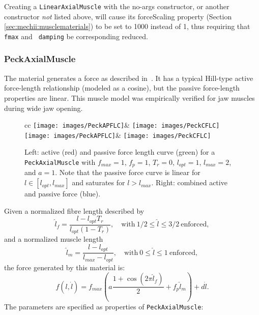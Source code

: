 \begin{sideblock}
Creating a {\tt LinearAxialMuscle} with the no-args constructor, or
another constructor {\it not} listed above, will cause its {\sf
forceScaling} property (Section \ref{sec:mechii:musclematerials}) to
be set to 1000 instead of 1, thus requiring that {\tt fmax} and {\tt
damping} be corresponding reduced.
\end{sideblock}

\subsubsection{PeckAxialMuscle}

The 
material generates a force as described in~\cite{peck2000dynamic}. 
It has a typical Hill-type active force-length relationship (modeled
as a cosine), but the passive force-length properties are linear. This
muscle model was empirically verified for jaw muscles during wide jaw
opening.

\begin{figure}[ht]
\begin{center}
\begin{tabular}{cc}
   \iflatexml
      \texttt{[image: images/PeckAPFLC]}&
      \texttt{[image: images/PeckCFLC]}
   \else
      \texttt{[image: images/PeckAPFLC]}&
      \texttt{[image: images/PeckCFLC]}
   \fi
\end{tabular}
\end{center}
\caption{Left: active (red) and passive force length curve (green)
for a {\tt PeckAxialMuscle} with $f_{max} = 1$, $f_{p} = 1$, $T_r =
0$, $l_{opt} = 1$, $l_{max} = 2$, and $a = 1$. Note that the passive
force curve is linear for $l \in [l_{opt}, l_{max}]$ and saturates for
$l > l_{max}$. Right: combined active and passive force (blue).}
\label{PeckCurves:fig}
\end{figure}

Given a normalized fibre length described by
%
\begin{equation}
\hat l_f = \frac{l - l_{opt} T_r}{l_{opt} (1 - T_r)}, 
\quad \mathrm{with}~ 1/2 \le \hat l \le 3/2~\mathrm{enforced},
\end{equation}
%
and a normalized muscle length 
%
\begin{equation}
\hat l_m = \frac{l - l_{opt}}{l_{max} - l_{opt}}, 
\quad \mathrm{with}~ 0 \le \hat l \le 1~\mathrm{enforced},
\end{equation}
%
the force generated by this material is:
%
\begin{equation}
f(l, \dot l) = 
f_{max} \left( a \frac{1 + \cos(2 \pi \hat l_f)}{2} +  f_{p} \hat l_m \right) + d \dot l.
\label{PeckAxialMuscle:eqn}
\end{equation}
%
The parameters are specified as properties of {\tt PeckAxialMuscle}:

